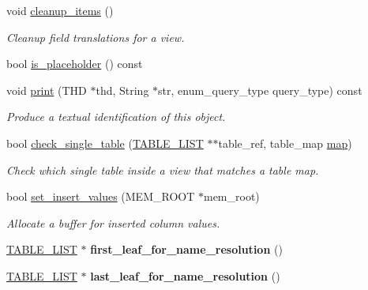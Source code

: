 \begin{DoxyCompactItemize}
void \mbox{\hyperlink{structTABLE__LIST_a62d0e797cda12a471f03b5692ca94ac6}{cleanup\+\_\+items}} ()
\begin{DoxyCompactList}\small\item\em Cleanup field translations for a view. \end{DoxyCompactList}\item 
bool \mbox{\hyperlink{structTABLE__LIST_aa8a3e28262bcccaea50da6e2a71d37a8}{is\+\_\+placeholder}} () const
\item 
void \mbox{\hyperlink{structTABLE__LIST_a150941693e3ab1b041c7fb3dd98eb8db}{print}} (T\+HD $\ast$thd, String $\ast$str, enum\+\_\+query\+\_\+type query\+\_\+type) const
\begin{DoxyCompactList}\small\item\em Produce a textual identification of this object. \end{DoxyCompactList}\item 
bool \mbox{\hyperlink{structTABLE__LIST_ae5f93d5c8045cba433322ca340bad8b7}{check\+\_\+single\+\_\+table}} (\mbox{\hyperlink{structTABLE__LIST}{T\+A\+B\+L\+E\+\_\+\+L\+I\+ST}} $\ast$$\ast$table\+\_\+ref, table\+\_\+map \mbox{\hyperlink{structTABLE__LIST_a24a1eac5a4be4ed7407792e12795191b}{map}})
\begin{DoxyCompactList}\small\item\em Check which single table inside a view that matches a table map. \end{DoxyCompactList}\item 
bool \mbox{\hyperlink{structTABLE__LIST_a6927ca9c8af85e8c97148794e08cc641}{set\+\_\+insert\+\_\+values}} (M\+E\+M\+\_\+\+R\+O\+OT $\ast$mem\+\_\+root)
\begin{DoxyCompactList}\small\item\em Allocate a buffer for inserted column values. \end{DoxyCompactList}\item 
\mbox{\label{structTABLE__LIST_ada3270a217de571fdbc54c4c352df2b1}} 
\mbox{\hyperlink{structTABLE__LIST}{T\+A\+B\+L\+E\+\_\+\+L\+I\+ST}} $\ast$ {\bfseries first\+\_\+leaf\+\_\+for\+\_\+name\+\_\+resolution} ()
\item 
\mbox{\label{structTABLE__LIST_af213961a61b88c8ee467fa17e2cb19ae}} 
\mbox{\hyperlink{structTABLE__LIST}{T\+A\+B\+L\+E\+\_\+\+L\+I\+ST}} $\ast$ {\bfseries last\+\_\+leaf\+\_\+for\+\_\+name\+\_\+resolution} ()
\item 
$$
\end{DoxyCompactItemize}
